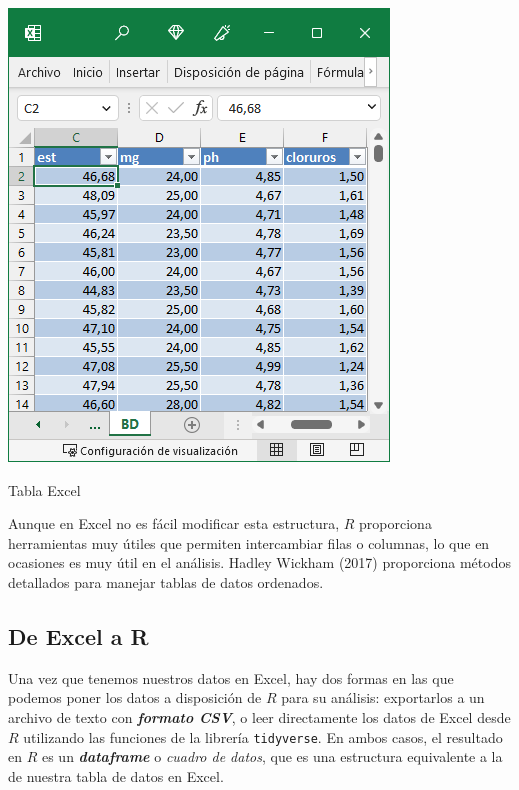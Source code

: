 \documentclass[
  letterpaper,
]{scrbook}
\begin{document}
\begin{marginfigure}

{\centering \includegraphics{./01-imagenes/2023-01-20-1.png}

}

\caption{Tabla Excel}

\end{marginfigure}

Aunque en Excel no es fácil modificar esta estructura, \(R\) proporciona
herramientas muy útiles que permiten intercambiar filas o columnas, lo
que en ocasiones es muy útil en el análisis. Hadley Wickham (2017)
proporciona métodos detallados para manejar tablas de datos ordenados.

\hypertarget{de-excel-a-r}{%
\subsection{De Excel a R}\label{de-excel-a-r}}

Una vez que tenemos nuestros datos en Excel, hay dos formas en las que
podemos poner los datos a disposición de \(R\) para su análisis:
exportarlos a un archivo de texto con \textbf{\emph{formato CSV}}, o
leer directamente los datos de Excel desde \(R\) utilizando las
funciones de la librería \texttt{tidyverse}. En ambos casos, el
resultado en \(R\) es un \textbf{\emph{dataframe}} o \emph{cuadro de
datos}, que es una estructura equivalente a la de nuestra tabla de datos
en Excel.
\end{document}
